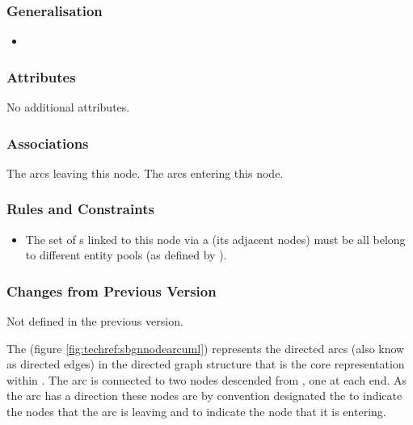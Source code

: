 \subsubsection{Generalisation}

\begin{itemize}
\item {}
\end{itemize}

\subsubsection{Attributes}

No additional attributes.

\subsubsection{Associations}

\begin{attributes}
   The arcs leaving this node.
   The arcs entering this node.
\end{attributes}

\subsubsection{Rules and Constraints}

\begin{itemize}
\item The set of s linked to this node via a
   (its adjacent nodes) must be all belong to
  different entity pools (as defined by ).
\end{itemize}

\subsubsection{Changes from Previous Version}

Not defined in the previous version.

\label{defn:SBGNArc}

The  (figure \ref{fig:techref:sbgnnodearcuml}) represents
the directed arcs (also know as directed edges) in the directed graph
structure that is the core representation within \PDl. The arc is
connected to two nodes descended from , one at
each end. As the arc has a direction these nodes are by convention
designated the  to indicate the nodes that the arc
is leaving and  to indicate the node that it is
entering.

